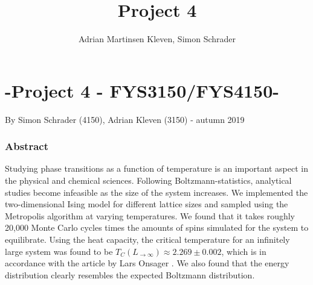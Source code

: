 \documentclass[10pt,a4paper]{article}
\author{Adrian Martinsen Kleven, Simon Schrader}
\title{Project 4}
\begin{document}
\part*{-Project 4 - FYS3150/FYS4150-
}
{\large By Simon Schrader (4150), Adrian Kleven (3150) - autumn 2019
}
\tableofcontents

\listoffigures
\listoftables


\clearpage

\section{Abstract}
Studying phase transitions as a function of temperature is an important aspect in the physical and chemical sciences. Following Boltzmann-statistics, analytical studies become infeasible as the size of the system increases.  We implemented the two-dimensional Ising model for different lattice sizes and sampled using the Metropolis algorithm at varying temperatures. We found that it takes roughly 20,000 Monte Carlo cycles times the amounts of spins simulated for the system to equilibrate. Using the heat capacity, the critical temperature for an infinitely large system was found to be $T_C(L_{\rightarrow \infty})\approx2.269\pm0.002$, which is in accordance with the article by Lars Onsager \cite{onsager1944two}. We also found that the energy distribution clearly resembles the expected Boltzmann distribution. 
\end{document}
